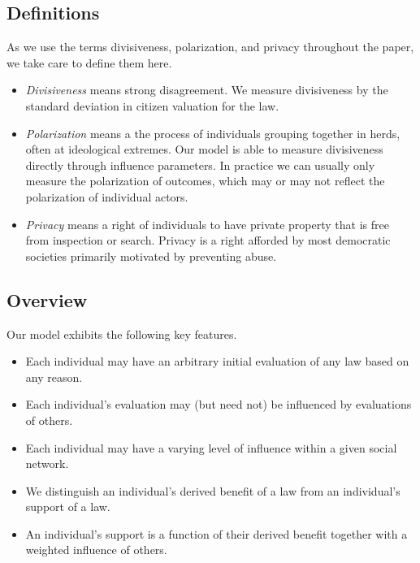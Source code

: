 \subsection{Definitions}
As we use the terms divisiveness, polarization, and privacy throughout the paper, we take care to define them here.

\begin{itemize}
\item  \emph{Divisiveness} means strong disagreement. We measure divisiveness by the standard deviation in citizen valuation for the law.

\item \emph{Polarization} means a the process of individuals grouping together in herds, often at ideological extremes. Our model is able to measure divisiveness directly through influence parameters.  In practice we can usually only measure the polarization of outcomes, which may or may not reflect the polarization of individual actors.  

\item \emph{Privacy} means a right of individuals to have private property that is free from inspection or search. Privacy is a right afforded by most democratic societies primarily motivated by preventing abuse.

\end{itemize}

\subsection{Overview}
Our model exhibits the following key features. 
\begin{itemize}
\item Each individual may have an arbitrary initial evaluation of any law based on any reason.
\item Each individual's evaluation may (but need not) be influenced by evaluations of others.
\item Each individual may have a varying level of influence within a given social network.
\item We distinguish an individual's derived benefit of a law from an individual's support of a law. 
\item An individual's support is a function of their derived benefit together with a weighted influence of others. %
\end{itemize}

